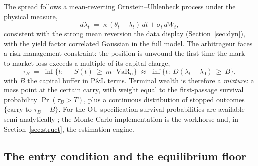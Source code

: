 \documentclass[11pt]{article}
\newcommand{\VaR}{\mathrm{VaR}}
\begin{document}
The spread follows a mean-reverting Ornstein--Uhlenbeck process under the physical measure,
\begin{equation}
d\lambda_t \;=\; \kappa\,(\theta_t-\lambda_t)\,dt+\sigma_t\,dW_t,
\label{eq:ou}
\end{equation}
consistent with the strong mean reversion the data display (Section~\ref{sec:dyn}), with the yield factor correlated Gaussian in the full model. The arbitrageur faces a risk-management constraint: the position is unwound the first time the mark-to-market loss exceeds a multiple of its capital charge,
\begin{equation}
\tau_B \;=\; \inf\{t:\ -S(t)\ \ge\ m\cdot\VaR_\alpha\}\;\approx\;\inf\{t:\ D(\lambda_t-\lambda_0)\ \ge\ B\},
\end{equation}
with $B$ the capital buffer in P\&L terms. Terminal wealth is therefore a \emph{mixture}: a mass point at the certain carry, with weight equal to the first-passage survival probability $\Pr(\tau_B>T)$, plus a continuous distribution of stopped outcomes $\{\text{carry to }\tau_B - B\}$. For the OU specification survival probabilities are available semi-analytically \citep{alili2005,linetsky2004}; the Monte Carlo implementation is the workhorse and, in Section~\ref{sec:struct}, the estimation engine.

\subsection{The entry condition and the equilibrium floor}
\end{document}
